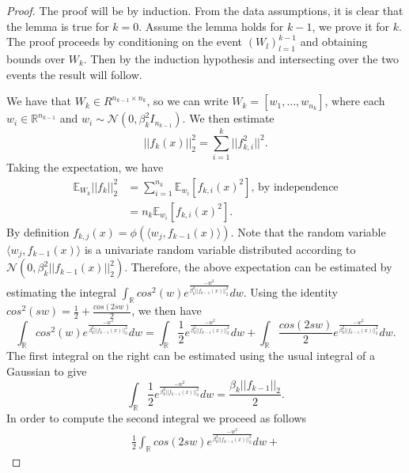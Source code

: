 \documentclass{article}
\theoremstyle{plain}
\theoremstyle{definition}
\theoremstyle{remark}
\newcommand\R{\mathbb{R}}
\begin{document}
\begin{proof}
The proof will be by induction. From the data assumptions, it is clear that the lemma is true for $k = 0$. Assume the lemma holds for $k-1$, we prove it for $k$.
The proof proceeds by conditioning on the event $(W_l)_{l=1}^{k-1}$ and obtaining
bounds over $W_k$. Then by the induction hypothesis and intersecting over the two events the result will follow.


We have that
$W_k \in R^{n_{k-1}\times n_{k}}$, so we can write $W_k = [w_1,\ldots ,w_{n_k}]$, where each $w_i \in \R^{n_{k-1}}$ and $w_i \sim 
\mathcal{N}(0, \beta_k^2I_{n_{k-1}})$. We then estimate
\begin{equation*}
	\vert\vert f_k(x)\vert\vert_2^2 = \sum_{i=1}^k
	\vert\vert f_{k,i}^2\vert\vert^2.
\end{equation*}
Taking the expectation, we have
\begin{align*}
	\mathbb{E}_{W_k}\vert\vert f_{k}\vert\vert_2^2 &= 
	\sum_{i=1}^{n_k}\mathbb{E}_{w_i}[f_{k,i}(x)^2]\text{, by independence} \\
	&= n_k \mathbb{E}_{w_i}[f_{k,i}(x)^2].
\end{align*}
By definition $f_{k,j}(x) = \phi(\langle w_j,f_{k-1}(x)\rangle)$. Note that the random variable $\langle w_j,f_{k-1}(x)\rangle$ is a univariate random variable distributed according to 
$\mathcal{N}(0, \beta_k^2\vert\vert f_{k-1}(x)\vert\vert_2^2)$. Therefore, the above expectation can be estimated by estimating the integral
$\int_{\R}cos^2(w)
e^{\frac{-w^2}{\beta_k^2\vert\vert f_{k-1}(x)\vert\vert_2^2}}dw$. Using the identity $cos^2(sw) = \frac{1}{2} + \frac{cos(2sw)}{2}$, we then have
\begin{equation}
\int_{\R}cos^2(w)e^{\frac{-w^2}{\beta_k^2\vert\vert f_{k-1}(x)\vert\vert_2^2}}dw
=
\int_{\R}\frac{1}{2}e^{\frac{-w^2}{\beta_k^2\vert\vert f_{k-1}(x)\vert\vert_2^2}}dw + 
\int_{\R}\frac{cos(2sw)}{2}
e^{\frac{-w^2}{\beta_k^2\vert\vert f_{k-1}(x)\vert\vert_2^2}}dw.
\end{equation}  
The first integral on the right can be estimated using the usual integral of a Gaussian to give
\begin{equation*}
	\int_{\R}\frac{1}{2}e^{\frac{-w^2}{\beta_k^2\vert\vert f_{k-1}(x)\vert\vert_2^2}}dw = 
	\frac{\beta_k\vert\vert f_{k-1}\vert\vert_2}{2}.
\end{equation*}
In order to compute the second integral we proceed as follows
\begin{align*}
	\frac{1}{2}\int_{\R}cos(2sw)
	e^{\frac{-w^2}{\beta_k^2\vert\vert f_{k-1}(x)\vert\vert_2^2}}dw + 

\end{align*}
\end{proof}
\end{document}
